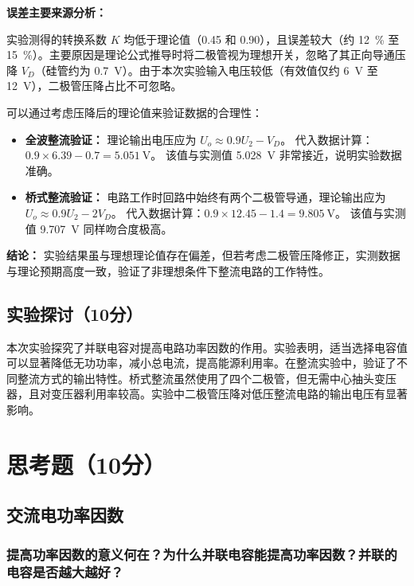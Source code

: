 \documentclass{../template/Report}%
\begin{document}
\begin{fullreportonly}
    \textbf{误差主要来源分析：}

    实验测得的转换系数 $K$ 均低于理论值（0.45 和 0.90），且误差较大（约 \SI{12}{\percent} 至 \SI{15}{\percent}）。主要原因是理论公式推导时将二极管视为理想开关，忽略了其正向导通压降 $V_D$（硅管约为 \SI{0.7}{\volt}）。由于本次实验输入电压较低（有效值仅约 \SI{6}{\volt} 至 \SI{12}{\volt}），二极管压降占比不可忽略。

    可以通过考虑压降后的理论值来验证数据的合理性：
    \begin{itemize}
        \item \textbf{全波整流验证：} 理论输出电压应为 $U_o \approx 0.9 U_2 - V_D$。
              代入数据计算：$0.9 \times 6.39 - 0.7 = \SI{5.051}{\volt}$。
              该值与实测值 \SI{5.028}{\volt} 非常接近，说明实验数据准确。

        \item \textbf{桥式整流验证：} 电路工作时回路中始终有两个二极管导通，理论输出应为 $U_o \approx 0.9 U_2 - 2V_D$。
              代入数据计算：$0.9 \times 12.45 - 1.4 = \SI{9.805}{\volt}$。
              该值与实测值 \SI{9.707}{\volt} 同样吻合度极高。
    \end{itemize}

    \textbf{结论：} 实验结果虽与理想理论值存在偏差，但若考虑二极管压降修正，实测数据与理论预期高度一致，验证了非理想条件下整流电路的工作特性。

    \subsection{实验探讨（10分）}
    本次实验探究了并联电容对提高电路功率因数的作用。实验表明，适当选择电容值可以显著降低无功功率，减小总电流，提高能源利用率。在整流实验中，验证了不同整流方式的输出特性。桥式整流虽然使用了四个二极管，但无需中心抽头变压器，且对变压器利用率较高。实验中二极管压降对低压整流电路的输出电压有显著影响。

    \section{思考题（10分）}

    \subsection{交流电功率因数}

    \subsubsection{提高功率因数的意义何在？为什么并联电容能提高功率因数？并联的电容是否越大越好？}


\end{fullreportonly}
\end{document}
